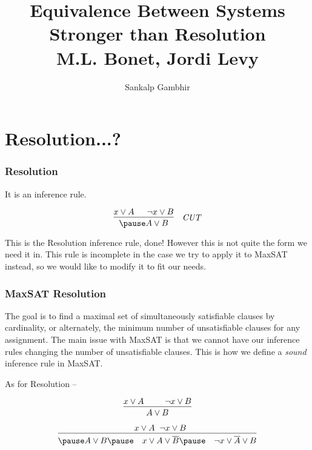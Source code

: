 \documentclass[aspectratio=169]{beamer}
\title{Equivalence Between Systems Stronger than Resolution \\
{\small M.L. Bonet, Jordi Levy}}
\author{Sankalp Gambhir}
\newcounter{notes}
\begin{document}
    \frame{\titlepage}
    \section{Resolution...?}
    \begin{frame}
        \frametitle{Resolution}
        It is an inference rule. \pause

            \[\begin{prooftree}
                \hypo{x \lor A}
                \hypo{\lnot x \lor B}
                \infer2{\pause A \lor B}
            \end{prooftree}
            \quad \textit{CUT}
            \]

        \pause This is the Resolution inference rule, done! \pause However this
        is not quite the form we need it in. This rule is incomplete in the case
        we try to apply it to MaxSAT instead\pause, so we would like to modify
        it to fit our needs. 
    \end{frame}
    \begin{frame}
        \frametitle{MaxSAT Resolution}
        The goal is to find a maximal set of simultaneously satisfiable clauses
        by cardinality, or alternately, the minimum number of unsatisfiable
        clauses for any assignment. \pause The main issue with MaxSAT is that we
        cannot have our inference rules changing the number of unsatisfiable
        clauses. This is how we define a \emph{sound} inference rule in MaxSAT.

        As for Resolution --

        \begin{multicols}{2}
            \[\begin{prooftree}[center, separation=2.5em]
                \hypo{x \lor A}
                \hypo{\lnot x \lor B}
                \infer2{A \lor B}
            \end{prooftree}\]

            \pause
            \columnbreak

            \[\begin{prooftree}[center, separation=2.5em]
                \hypo{x \lor A & \lnot x \lor B}
                \infer1{\pause A \lor B \pause \quad x \lor A \lor \overline{B} \pause \quad \lnot x \lor \overline{A} \lor B}
            \end{prooftree}\]

        \end{multicols}

    \end{frame}
\end{document}
